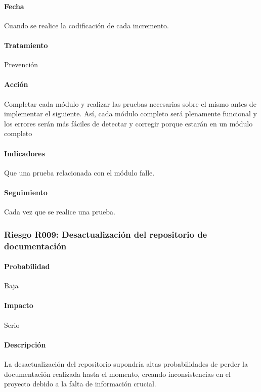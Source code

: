 \documentclass[10pt,a4paper]{article}
\begin{document}
				\paragraph{Fecha} Cuando se realice la codificación de cada incremento. %
				\paragraph{Tratamiento} Prevención %
				\paragraph{Acción} Completar cada módulo y realizar las pruebas necesarias sobre el mismo antes de implementar el siguiente. Así, cada módulo completo será plenamente funcional y los errores serán más fáciles de detectar y corregir porque estarán en un módulo completo%
				\paragraph{Indicadores} Que una prueba relacionada con el módulo falle.  %
				\paragraph{Seguimiento}	Cada vez que se realice una prueba. %
								
			\subsubsection{Riesgo R009: Desactualización del repositorio de documentación}
				\paragraph{Probabilidad} Baja
				\paragraph{Impacto}	Serio
				\paragraph{Descripción} La desactualización del repositorio supondría altas probabilidades de perder la documentación realizada hasta el momento, creando inconsistencias en el proyecto debido a la falta de información crucial. 
\end{document}
